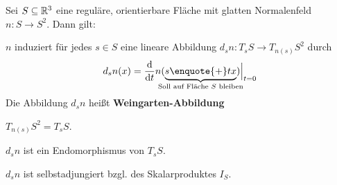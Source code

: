 \begin{proposition}\label{prop:5.1}%
    Sei $S \subseteq \mathbb{R}^3$ eine reguläre, orientierbare Fläche mit glatten
    Normalenfeld $n: S \rightarrow S^2$. Dann gilt:

    \begin{propenum}
        \item \label{prop:5.1a} $n$ induziert für jedes $s \in S$ eine lineare Abbildung $d_s n: T_s S \rightarrow T_{n(s)} S^2$
              durch
              \[d_s n(x) = \frac{\mathrm{d}}{\mathrm{d} t} n (\underbrace{s \text{\enquote{+}} tx}_{\mathclap{\text{Soll auf Fläche $S$ bleiben}}}) \Bigr |_{t=0}\]
              Die Abbildung $d_s n$ heißt \textbf{Weingarten-Abbildung}
        \item $T_{n(s)} S^2 = T_s S$.
        \item $d_s n$ ist ein Endomorphismus von $T_s S$.
        \item $d_s n$ ist selbstadjungiert bzgl. des Skalarproduktes $I_S$.
    \end{propenum}
\end{proposition}

